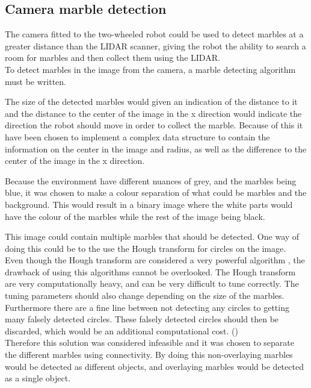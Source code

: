 \documentclass[../Head/Main.tex]{subfiles}
\begin{document}
\subsection{Camera marble detection}
The camera fitted to the two-wheeled robot could be used to detect marbles at a greater distance than the LIDAR scanner, giving the robot the ability to search a room for marbles and then collect them using the LIDAR.\\
To detect marbles in the image from the camera, a marble detecting algorithm must be written.\par 

The size of the detected marbles would given an indication of the distance to it and the distance to the center of the image in the x direction would indicate the direction the robot should move in order to collect the marble. Because of this it have been chosen to implement a complex data structure to contain the information on the center in the image and radius, as well as the difference to the center of the image in the x direction.\par 

Because the environment have different nuances of grey, and the marbles being blue, it was chosen to make a colour separation of what could be marbles and the background. This would result in a binary image where the white parts would have the colour of the marbles while the rest of the image being black.\par 
This image could contain multiple marbles that should be detected. One way of doing this could be to the use the Hough transform for circles on the image.\\
Even though the Hough transform are considered a very powerful algorithm , the drawback of using this algorithms cannot be overlooked. The Hough transform are very computationally heavy, and can be very difficult to tune correctly. The tuning parameters should also change depending on the size of the marbles. Furthermore there are a fine line between not detecting any circles to getting many falsely detected circles. These falsely detected circles should then be discarded, which would be an additional computational cost. (\cite[108-112]{OCV})\\
Therefore this solution was considered infeasible and it was chosen to separate the different marbles using connectivity. By doing this non-overlaying marbles would be detected as different objects, and overlaying marbles would be detected as a single object. \par 
\end{document}
